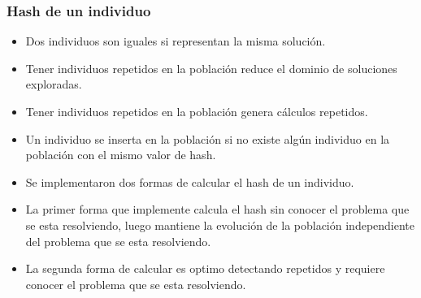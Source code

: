 \documentclass{beamer}
\begin{document}
\begin{frame}
\frametitle{Hash de un individuo}

\begin{itemize}
    \item Dos individuos son iguales si representan la misma solución.
    \pause
    \item Tener individuos repetidos en la población reduce el dominio de soluciones exploradas.
    \pause
    \item Tener individuos repetidos en la población genera cálculos repetidos.
    \pause
    \item Un individuo se inserta en la población si no existe algún individuo en la población con el mismo valor de hash.
    \pause
    \item Se implementaron dos formas de calcular el hash de un individuo.
    \pause
    \item La primer forma que implemente calcula el hash sin conocer el problema que se esta resolviendo, luego mantiene la evolución de la población independiente del problema que se esta resolviendo.
    \pause
    \item La segunda forma de calcular es optimo detectando repetidos y requiere conocer el problema que se esta resolviendo.
\end{itemize}

\end{frame}

\end{document}
